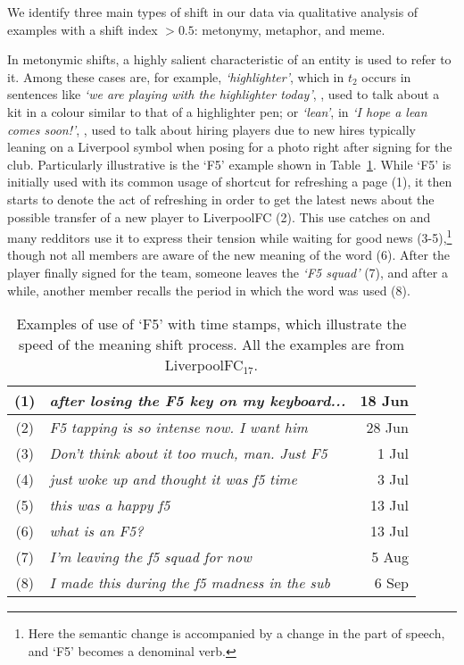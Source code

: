 We identify three main types of shift in our data via qualitative analysis of examples with a shift index $> 0.5$: metonymy, metaphor, and meme.  

In metonymic shifts, a highly salient characteristic of an entity is used to refer to it. Among these cases are, for example, {\em `highlighter'}, which in $t_2$ occurs in sentences like \textit{`we are playing with the highlighter today'},
, 
used to talk about a kit in a colour similar to that of a highlighter pen; or {\em `lean'}, in \textit{`I hope a lean comes soon!'},
, 
used to talk about hiring players due to new hires typically leaning on a Liverpool symbol when posing for a photo right after signing for the club. Particularly illustrative is the `F5' example shown in
Table~\ref{table:f5}. While `F5' is initially used with its common usage of shortcut for refreshing a page (1), it then starts to denote the act of refreshing in order to get the latest news about the possible transfer of a new player to LiverpoolFC (2). This use catches on and many redditors use it to express their tension while waiting for good news (3-5),\footnote{Here the semantic change is accompanied by a change in the part of speech, and `F5' becomes a denominal verb.}
though not all members are aware of the new meaning of the word (6). After the player finally signed for the team, someone leaves the {\em `F5 squad'} (7), and after a while, another member recalls the period in which the word was used (8).


\begin{table}[t]\centering   \small
    \begin{tabular}{@{}cp{5.5cm}r@{}}
        \hline
        (1) & \em after losing the F5 key on my keyboard... & 18 Jun\\\hline
        (2) & \em F5 tapping is so intense now. I want him & 28 Jun\\\hline
        (3) & \em Don't think about it too much, man. Just F5 & 1 Jul\\\hline
        (4) & \em just woke up and thought it was f5 time & 3 Jul\\\hline
        (5) & \em this was a happy f5 & 13 Jul\\\hline
        (6) & \em what is an F5? & 13 Jul \\\hline
        (7) & \em I'm leaving the f5 squad for now & 5 Aug\\\hline
        (8) & \em I made this during the f5 madness in the sub & 6 Sep\\\hline      
    \end{tabular}
    \vspace*{-0.2cm}
    \caption{Examples of use of `F5' with time stamps, which illustrate the speed of the meaning shift process. All the examples are from LiverpoolFC$_{17}$.}
    \vspace*{-0.2cm}
     \label{table:f5}
\end{table}


